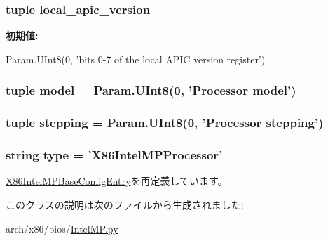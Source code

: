 \label{classIntelMP_1_1X86IntelMPProcessor_a50776c26d15de124f34400db4733af9a}
\hypertarget{classIntelMP_1_1X86IntelMPProcessor_a242d4d9f781280279fd12a2358a55284}{
\subsubsection[{local\_\-apic\_\-version}]{\setlength{\rightskip}{0pt plus 5cm}tuple {\bf local\_\-apic\_\-version}}}
\label{classIntelMP_1_1X86IntelMPProcessor_a242d4d9f781280279fd12a2358a55284}
{\bfseries 初期値:}
\begin{DoxyCode}
Param.UInt8(0,
            'bits 0-7 of the local APIC version register')
\end{DoxyCode}
\hypertarget{classIntelMP_1_1X86IntelMPProcessor_a71f58678b345ddafeef7c59714d69e1a}{
\subsubsection[{model}]{\setlength{\rightskip}{0pt plus 5cm}tuple {\bf model} = Param.UInt8(0, 'Processor {\bf model}')}}
\label{classIntelMP_1_1X86IntelMPProcessor_a71f58678b345ddafeef7c59714d69e1a}
\hypertarget{classIntelMP_1_1X86IntelMPProcessor_add0c8d8c5208bd8afde960dafafd2d5d}{
\subsubsection[{stepping}]{\setlength{\rightskip}{0pt plus 5cm}tuple {\bf stepping} = Param.UInt8(0, 'Processor {\bf stepping}')}}
\label{classIntelMP_1_1X86IntelMPProcessor_add0c8d8c5208bd8afde960dafafd2d5d}
\hypertarget{classIntelMP_1_1X86IntelMPProcessor_acce15679d830831b0bbe8ebc2a60b2ca}{
\subsubsection[{type}]{\setlength{\rightskip}{0pt plus 5cm}string {\bf type} = '{\bf X86IntelMPProcessor}'}}
\label{classIntelMP_1_1X86IntelMPProcessor_acce15679d830831b0bbe8ebc2a60b2ca}


\hyperlink{classIntelMP_1_1X86IntelMPBaseConfigEntry_acce15679d830831b0bbe8ebc2a60b2ca}{X86IntelMPBaseConfigEntry}を再定義しています。

このクラスの説明は次のファイルから生成されました:\begin{DoxyCompactItemize}
\item 
arch/x86/bios/\hyperlink{IntelMP_8py}{IntelMP.py}\end{DoxyCompactItemize}
